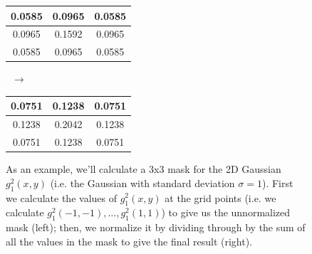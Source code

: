 \begin{figure}[t]
\begin{center}
\begin{tabular}{|c|c|c|}
\hline
0.0585 & 0.0965 & 0.0585 \\
\hline
0.0965 & 0.1592 & 0.0965 \\
\hline
0.0585 & 0.0965 & 0.0585 \\
\hline
\end{tabular}%
$\;\; \longrightarrow \;\;$%
\begin{tabular}{|c|c|c|}
\hline
0.0751 & 0.1238 & 0.0751 \\
\hline
0.1238 & 0.2042 & 0.1238 \\
\hline
0.0751 & 0.1238 & 0.0751 \\
\hline
\end{tabular}
\end{center}
\caption{As an example, we'll calculate a 3x3 mask for the 2D Gaussian $g_1^2(x,y)$ (i.e. the Gaussian with standard deviation $\sigma = 1$). First we calculate the values of $g_1^2(x,y)$ at the grid points (i.e. we calculate $g_1^2(-1,-1), \ldots, g_1^2(1,1)$) to give us the unnormalized mask (left); then, we normalize it by dividing through by the sum of all the values in the mask to give the final result (right).}
\label{fig:segmentation-watershed-gaussianmask}
\end{figure}

